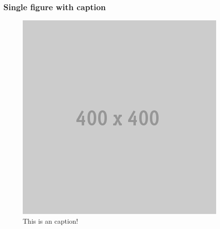 
\label{figures2}
\begin{frame}\frametitle{Single figure with caption}
  \begin{figure}[htb]
    \centering
    \includegraphics[scale=0.25]{examples/figures/400x400.png}
    \caption{This is an caption!}
  \end{figure}
\end{frame}
